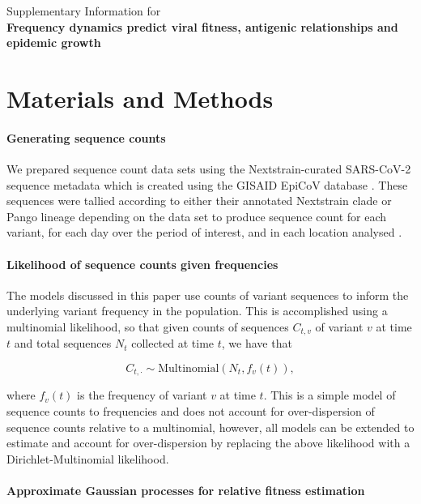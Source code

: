 \documentclass[11pt,oneside,letterpaper]{article}
\begin{document}
\begin{center}\Large
Supplementary Information for \\
\bf Frequency dynamics predict viral fitness, antigenic relationships and epidemic growth
\end{center}

\section*{Materials and Methods}

\paragraph{Generating sequence counts}

We prepared sequence count data sets using the Nextstrain-curated SARS-CoV-2 sequence metadata \cite{Hadfield2018} which is created using the GISAID EpiCoV database \cite{khare2021gisaid}.
These sequences were tallied according to either their annotated Nextstrain clade or Pango lineage depending on the data set to produce sequence count for each variant, for each day over the period of interest, and in each location analysed \cite{aksamentov2021nextclade}.


\paragraph{Likelihood of sequence counts given frequencies}

The models discussed in this paper use counts of variant sequences to inform the underlying variant frequency in the population.
This is accomplished using a multinomial likelihood, so that given counts of sequences $C_{t,v}$ of variant $v$ at time $t$ and total sequences $N_{t}$ collected at time $t$, we have that

\begin{equation*}
    C_{t, \cdot} \sim \text{Multinomial}(N_{t}, f_{v}(t)),
\end{equation*}

where $f_{v}(t)$ is the frequency of variant $v$ at time $t$.
This is a simple model of sequence counts to frequencies and does not account for over-dispersion of sequence counts relative to a multinomial, however, all models can be extended to estimate and account for over-dispersion by replacing the above likelihood with a Dirichlet-Multinomial likelihood.

\paragraph{Approximate Gaussian processes for relative fitness estimation}%
\end{document}
